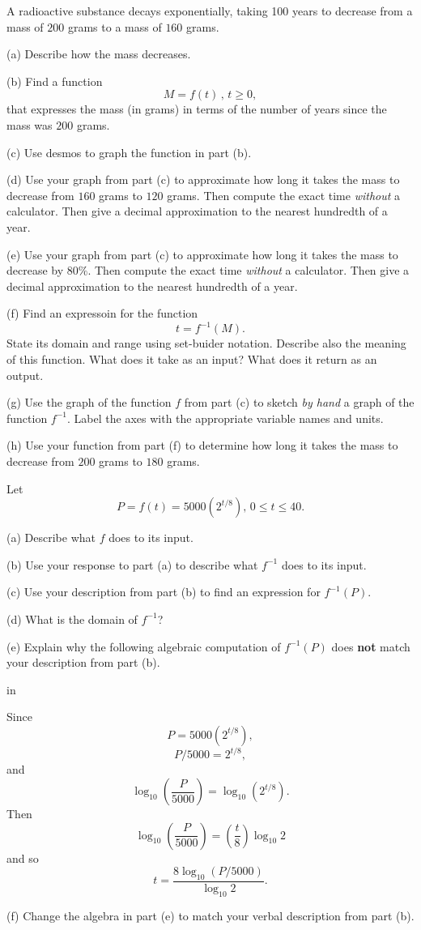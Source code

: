 \documentclass{ximera}
\newcommand{\pskip}{\vskip 0.1 in}
\begin{document}
\begin{question}  \label{Q:dfbhhhhh}
A radioactive substance decays exponentially, taking 100 years to decrease from a mass of $200$ grams to a mass of $160$ grams.

(a) Describe how the mass decreases.

(b)  Find a function 
\[
 M= f(t) \, , \, t\geq 0 ,
\]
that expresses the mass (in grams) in terms of the number of years since the mass was $200$ grams.

(c) Use desmos to graph the function in part (b). 

(d) Use your graph from part (c) to approximate how long it takes the mass to decrease from $160$ grams to $120$ grams. Then compute the exact time \emph{without} a calculator. Then give a decimal approximation to the nearest hundredth of a year.

(e) Use your graph from part (c) to approximate how long it takes the mass to decrease by $80\%$. Then compute the exact time \emph{without} a calculator. Then give a decimal approximation to the nearest hundredth of a year.

(f) Find an expressoin for the function 
\[ 
      t  = f^{-1}(M) .
\]
State its domain and range using set-buider notation. Describe also the meaning of this function. What does it take as an input? What does it return as an output.

(g) Use the graph of the function $f$ from part (c) to sketch \emph{by hand} a graph of the function $f^{-1}$. Label the axes with the appropriate variable names and units.

(h) Use your function from part (f) to determine how long it takes the mass to decrease from $200$ grams to $180$ grams.

\end{question}



\begin{question} \label{Q5:LogF}
Let
\[
   P =  f(t) = 5000 (2^{t/8}) , \, 0\leq t \leq 40.
\]

(a) Describe what $f$ does to its input.

(b) Use your response to part (a) to describe what $f^{-1}$ does to its input.

(c) Use your description from part (b) to find an expression for $f^{-1}(P)$. 

(d) What is the domain of $f^{-1}$?

(e) Explain why the following algebraic computation of $f^{-1}(P)$ does {\bf not} match your description from part (b).

\pskip

Since
\[
   P = 5000 (2^{t/8}) ,
\]
\[
   P/5000 = 2^{t/8} ,
\]
and 
\[
   \log_{10}\left( \frac{P}{5000} \right) = \log_{10} (2^{t/8}) .
\]
Then
\[
   \log_{10}\left( \frac{P}{5000} \right) =  \left( \frac{t}{8}  \right)  \log_{10} 2 
\]
and so 
\[
    t = \frac{8 \log_{10}(P/5000)}{\log_{10} 2} .
\]

(f) Change the algebra in part (e) to match your verbal description from part (b).
\end{question}
\end{document}

